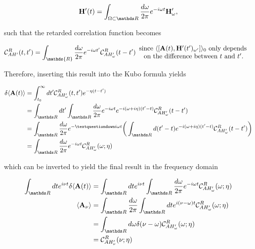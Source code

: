 \documentclass{homework}
\begin{document}
\begin{equation}
    \Hamiltonian'(t) = \int_{\Omega \subset \R} \frac{d\omega}{2\pi} e^{-i\omega t} \Hamiltonian'_\omega,
\end{equation}

such that the retarded correlation function becomes 

\begin{equation}
    \mathcal{C}_{AH'}^{R}(t,t') = \int_{\mathds{R}} \frac{d\omega}{2\pi} e^{-i\omega t'} \mathcal{C}_{AH'_\omega}^{R}(t-t') \begin{array}{c}
         \textnormal{since $\langle[{{\bf A}}(t), \Hamiltonian'(t')_{\omega'}]\rangle_{0}$ only depends } \\
         \textnormal{ on the difference between $t$ and $t'$. }
    \end{array}
\end{equation}

Therefore, inserting this result into the Kubo formula yields

\begin{equation}
    \begin{split}
        \delta \langle {{\bf A}}(t) \rangle
        &= \int_{t_0}^{\infty} dt' \mathcal{C}_{AH'_\omega}^{R}(t,t') e^{-\eta(t-t')} \\
        &= \int_{\R} dt' \int_{\R} \frac{d\omega}{2\pi} e^{-i\omega t} e^{-i(\omega + i\eta) (t'-t)} \mathcal{C}_{AH'_\omega}^{R}(t-t') \\
        &= \int_{\R} \frac{d\omega}{2\pi} e^{-¿i\omega t} \bigg(\int_{\R} d(t'-t) e^{-i(\omega + i\eta)(t'-t)} \mathcal{C}_{AH'_\omega}^{R}(t-t')\bigg) \\
        &= \int_{\R} \frac{d\omega}{2\pi} e^{-i\omega t} \mathcal{C}_{AH'_\omega}^{R}(\omega; \eta) 
    \end{split}
\end{equation}

which can be inverted to yield the final result in the frequency domain

\begin{equation}
    \begin{split}
        \int_{\R} {dt} e^{i\nu t}
        \delta \langle {{\bf A}}(t) \rangle &= \int_{\R} {dt} e^{i\nu t} \int_{\R} \frac{d\omega}{2\pi} e^{-i\omega t} \mathcal{C}_{AH'_\omega}^{R}(\omega; \eta) \\
        \langle {{\bf A}}_\nu \rangle &= \int_{\R} \frac{d\omega}{2\pi} \int_{\R} dt e^{i(\nu - \omega)t} \mathcal{C}_{AH'_\omega}^{R}(\omega; \eta) \\
        &= \int_{\R} {d\omega} \delta(\nu - \omega) \mathcal{C}_{AH'_\omega}^{R}(\omega; \eta) \\
        &= \mathcal{C}_{AH'_\nu}^{R}(\nu; \eta) 
    \end{split}
\end{equation}
\end{document}
